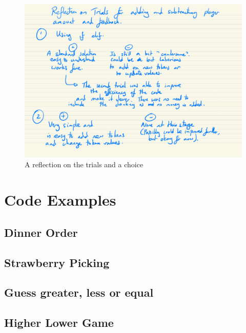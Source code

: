 \documentclass[a4paper,12pt]{article}
\begin{document}
\newpage

\begin{figure} [!h]
	\centering
	\includegraphics[width=15cm]{iterative_processes/Lucky_Unicorn_Sub_problems_3_a.pdf}
	\caption*{A reflection on the trials and a choice}
\end{figure}

\newpage

\newpage


\section{Code Examples}
\subsection{Dinner Order}

\subsection{Strawberry Picking}

\subsection{Guess greater, less or equal}

\subsection{Higher Lower Game}

\end{document}
